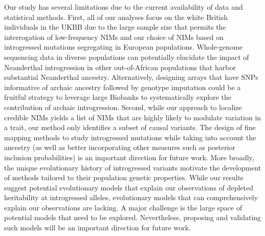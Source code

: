 Our study has several limitations due to the current availability of data and statistical methods. First, all of our analyses focus on the white British individuals in the UKBB due to the large sample size that permits the interrogation of low-frequency NIMs and our choice of NIMs based on introgressed mutations segregating in European populations. Whole-genome sequencing data in diverse populations can potentially elucidate the impact of Neanderthal introgression in other out-of-African populations that harbor substantial Neanderthal ancestry. Alternatively, designing arrays that have SNPs informative of archaic ancestry followed by genotype imputation could be a fruitful strategy to leverage large Biobanks to systematically explore the contribution of archaic introgression. Second, while our approach to localize credible NIMs yields a list of NIMs that are highly likely to modulate variation in a trait, our method only identifies a subset of causal variants. The design of fine mapping methods to study introgressed mutations while taking into account the ancestry (as well as better incorporating other measures such as posterior inclusion probabilities) is an important direction for future work. More broadly, the unique evolutionary history of introgressed variants motivate the development of methods tailored to their population genetic properties. While our results suggest potential evolutionary models that explain our observations of depleted heritability at introgressed alleles, evolutionary models that can comprehensively explain our observations are lacking. A major challenge is the large space of potential models that need to be explored. Nevertheless, proposing and validating such models will be an important direction for future work. 
